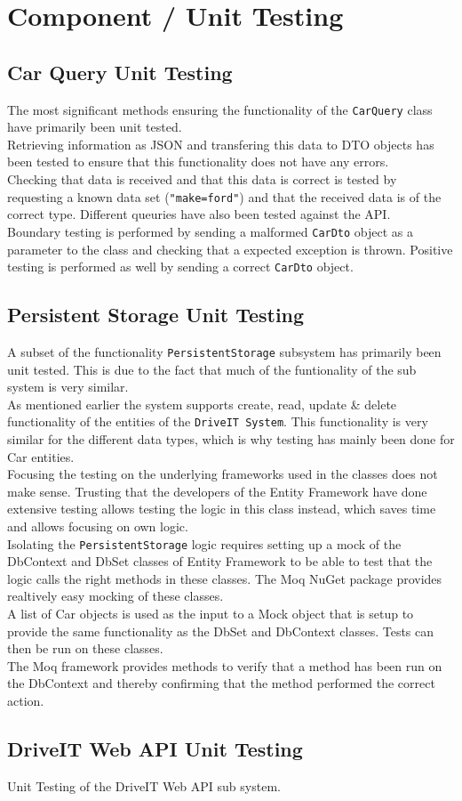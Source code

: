 \section{Component / Unit Testing}
\subsection{Car Query Unit Testing}
The most significant methods ensuring the functionality of the \texttt{CarQuery} class have primarily been unit tested.\\
Retrieving information as JSON and transfering this data to DTO objects has been tested to ensure that this functionality does not have any errors.\\
Checking that data is received and that this data is correct is tested by requesting a known data set (\texttt{"make=ford"}) and that the received data is of the correct type. Different queuries have also been tested against the API.\\ 
Boundary testing is performed by sending a malformed \texttt{CarDto} object as a parameter to the class and checking that a expected exception is thrown. Positive testing is performed as well by sending a correct \texttt{CarDto} object.

\subsection{Persistent Storage Unit Testing}
A subset of the functionality \texttt{PersistentStorage} subsystem has primarily been unit tested. This is due to the fact that much of the funtionality of the sub system is very similar.\\
As mentioned earlier the system supports create, read, update \& delete functionality of the entities of the \texttt{DriveIT System}. This functionality is very similar for the different data types, which is why testing has mainly been done for Car entities.\\
Focusing the testing on the underlying frameworks used in the classes does not make sense. Trusting that the developers of the Entity Framework have done extensive testing allows testing the logic in this class instead, which saves time and allows focusing on own logic.\\
Isolating the \texttt{PersistentStorage} logic requires setting up a mock of the DbContext and DbSet classes of Entity Framework to be able to test that the logic calls the right methods in these classes. The Moq NuGet package provides realtively easy mocking of these classes. \\
A list of Car objects is used as the input to a Mock object that is setup to provide the same functionality as the DbSet and DbContext classes. Tests can then be run on these classes.\\
The Moq framework provides methods to verify that a method has been run on the DbContext and thereby confirming that the method performed the correct action.

\subsection{DriveIT Web API Unit Testing}
Unit Testing of the DriveIT Web API sub system.